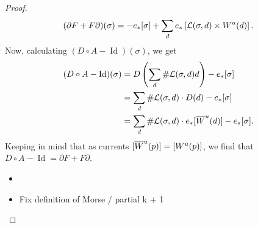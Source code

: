 \begin{proof}
    \[
        (\partial F + F \partial)(\sigma) = -e_* [\sigma] +\sum_{d} e_*\left[\mathcal L(\sigma, d) \times W^u(d)\right].
    \]
    Now, calculating $(D  \circ A - \operatorname{Id})(\sigma)$, we get
    \begin{align*}
        (D  \circ A - \operatorname{Id})(\sigma) &=
        D\left(\sum_d \# \mathcal L(\sigma, d) d\right) - e_*[\sigma]\\
        &= \sum_d \# \mathcal L(\sigma, d) \cdot D(d) - e_*[\sigma]\\
        &= \sum_d \# \mathcal L(\sigma, d) \cdot e_*[\overline{W}^u(d)] - e_*[\sigma]
    .\end{align*} 
    Keeping in mind that as currents $[\overline{W}^u(p)] = [W^u(p)]$, we find that $D  \circ  A - \operatorname{Id} = \partial F + F \partial$.

    \begin{itemize}
        \item {}
        \item Fix definition of Morse / partial k + 1
    \end{itemize}
\end{proof}

